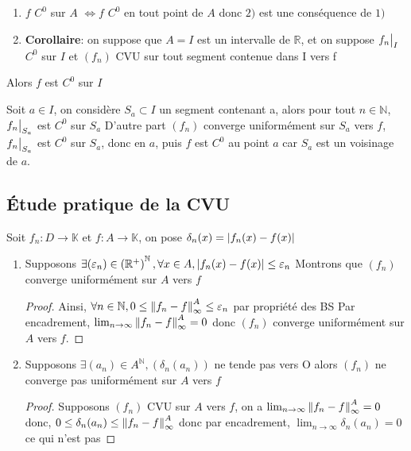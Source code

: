 \documentclass[11pt,hidelinks]{book}
\theoremstyle{mytheoremstyle}
\theoremstyle{mytheoremstyle}
\theoremstyle{mytheoremstyle}
\theoremstyle{mytheoremstyle}
\theoremstyle{mytheoremstyle}
\theoremstyle{mytheoremstyle}
\theoremstyle{mytheoremstyle}
\theoremstyle{mytheoremstyle}
\theoremstyle{myproblemstyle}
\def\mbb#1{\mathbb{#1}}
\def\bN{\mbb{N}}
\def\bR{\mbb{R}}
\def\bK{\mbb{K}}
\def\ln{\lim_{n \to \infty}}
\newcommand{\func}[3]{#1\colon#2\to#3}
\newcommand{\cvu}[2]{converge uniformément sur $#1$ vers $#2$}
\newcommand\restr[2]{{%
  \left.\kern-\nulldelimiterspace %
  #1 %
  \vphantom{\big|} %
  \right|_{#2} %
  }}
\begin{document}
\begin{adjustwidth}{-2em}{-1em}
\begin{theorem}
\begin{enumerate}
    
    \item $f$ $C^0$ sur $A$ $\Leftrightarrow f$ $C^0$ en tout point de $A$ donc $2)$ est une conséquence de $1)$
                        

    \item \textbf{Corollaire}: on suppose que $A=I$ est un intervalle de $\bR$, et on suppose $\restr{f_n}{I}$ $C^0$ sur $I$ et $(f_n)$ CVU sur tout segment contenue dans I vers f\newline
                \end{enumerate}
    Alors $f$ est $C^0$ sur $I$ 
    \begin{ef}
        Soit $a \in I$, on considère $S_a \subset I$ un segment contenant a, alors pour tout $n \in \bN$, $\restr{f_n}{S_a}$ est $C^0$ sur $S_a$ \newline
        D'autre part $(f_n)$ \cvu{S_a}{f}, $\restr{f_n}{S_a}$ est $C^0$ sur $S_a$, donc en $a$, puis $f$ est $C^0$ au point $a$ car $S_a$ est un voisinage de $a$.
    \end{ef}
\end{theorem}
\end{adjustwidth}

\subsection{Étude pratique de la CVU}
\begin{adjustwidth}{-2em}{-1em}
    \begin{prop}        
    Soit $\func{f_n}{D}{\bK}$ et $\func{f}{A}{\bK}$, on pose $\delta_n(x) = \abs{f_n(x) - f(x)}$
    \begin{enumerate}
    \item Supposons $\exists (\varepsilon_n) \in \left(\bR^{+}\right)^{\bN}, \forall x \in A, \abs{f_n(x) - f(x)} \leq \varepsilon_n$
    Montrons que $(f_n)$ \cvu{A}{f}
    \begin{proof}
        Ainsi, $\forall n \in \bN, 0 \leq \norm{f_n - f}^{A}_{\infty} \leq \varepsilon_n$ par propriété des BS
        Par encadrement, $\ln \norm{f_n - f}^{A}_{\infty} = 0$ donc $(f_n)$ \cvu{A}{f}.
    \end{proof}

    \item Supposons $\exists (a_n) \in A^{\bN},\left(\delta_n(a_n)\right)$ ne tende pas vers O alors $(f_n)$ ne converge pas uniformément sur $A$ vers $f$
    \begin{proof}
        Supposons $(f_n)$ CVU sur $A$ vers $f$, on a $\ln \norm{f_n - f}^{A}_{\infty} = 0$
        donc, $0 \leq \delta_n(a_n) \leq \norm{f_n - f}^{A}_{\infty}$
        donc par encadrement, $\ln \delta_n(a_n) = 0$ ce qui n'est pas 
    \end{proof}
\end{enumerate}    
\end{prop}
\end{adjustwidth}
\end{document}
